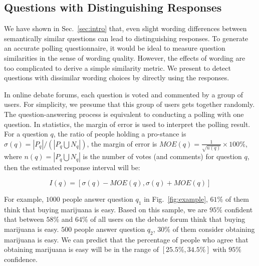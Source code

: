 \documentclass{llncs}
\begin{document}

\subsection{Questions with Distinguishing Responses}\label{sec:pair}
We have shown in Sec.~\ref{sec:intro} that, even slight wording differences between semantically similar questions can lead to distinguishing responses. To generate an accurate polling questionnaire, it would be ideal to measure question similarities in the sense of wording quality. However, the effects of wording are too complicated to derive a simple similarity metric. We present to detect questions with dissimilar wording choices by directly using the responses. 

In online debate forums, each question is voted and commented by a group of users. For simplicity, we presume that this group of users gets together randomly. The question-answering process is equivalent to conducting a polling with one question. In statistics, the margin of error is used to interpret the polling result. For a question $q$, the ratio of people holding a pro-stance is $\sigma(q)=|P_q|/(|P_q \bigcup N_q|)$, the margin of error is $MOE(q)=\frac{1}{\sqrt{ n(q)}}\times 100\%$, where $n(q)=|P_q\bigcup N_q|$ is the number of votes (and comments) for question $q$, then the estimated response interval will be:

\begin{equation}
I(q)=[\sigma(q)-MOE(q),\sigma(q)+MOE(q)]
\end{equation}



For example,  $1000$ people answer question $q_1$ in Fig.~\ref{fig:example}, $61\%$ of them think that buying marijuana is easy. Based on this sample, we are $95\%$ confident that between $58\%$ and $64\%$ of all users on the debate forum think that buying marijuana is easy.  $500$ people answer question $q_2$, $30\%$ of them consider obtaining marijuana is easy. We can predict  that the percentage of people who agree that obtaining marijuana is easy will be in the range of $[25.5\%,34.5\%]$ with $95\%$ confidence.
\end{document}
